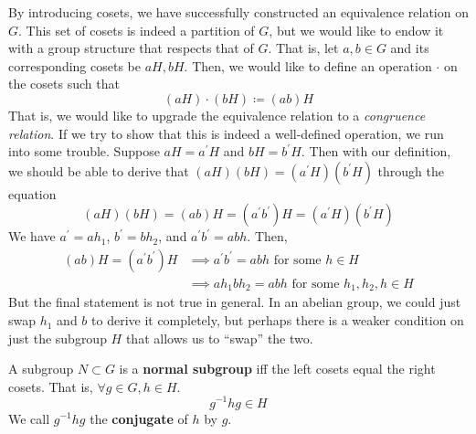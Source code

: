   By introducing cosets, we have successfully constructed an equivalence relation on $G$. This set of cosets is indeed a partition of $G$, but we would like to endow it with a group structure that respects that of $G$. That is, let $a, b \in G$ and its corresponding cosets be $aH, bH$. Then, we would like to define an operation $\cdot$ on the cosets such that 
  \begin{equation}
    (aH) \cdot (bH) \coloneqq (ab)H
  \end{equation} 
  That is, we would like to upgrade the equivalence relation to a \textit{congruence relation}. If we try to show that this is indeed a well-defined operation, we run into some trouble. Suppose $aH = a^\prime H$ and $bH = b^\prime H$. Then with our definition, we should be able to derive that $(aH)(bH) = (a^\prime H) (b^\prime H)$ through the equation 
  \begin{equation}
     (aH) (bH) = (ab)H = (a^\prime b^\prime) H = (a^\prime H) (b^\prime H) 
  \end{equation}
  We have $a^\prime = a h_1$, $b^\prime = b h_2$, and $a^\prime b^\prime = ab h$. Then, 
  \begin{align}
    (ab) H = (a^\prime b^\prime) H & \implies a^\prime b^\prime = abh \text{ for some } h \in H \\
                                   & \implies a h_1 b h_2 = abh \text{ for some } h_1, h_2, h \in H
  \end{align}
  But the final statement is not true in general. In an abelian group, we could just swap $h_1$ and $b$ to derive it completely, but perhaps there is a weaker condition on just the subgroup $H$ that allows us to ``swap'' the two. 

  \begin{definition}
    A subgroup $N \subset G$ is a \textbf{normal subgroup} iff the left cosets equal the right cosets. That is, $\forall g \in G, h \in H$. 
    \begin{equation}
      g^{-1} h g \in H
    \end{equation}
    We call $g^{-1} h g$ the \textbf{conjugate} of $h$ by $g$. 
  \end{definition} 


